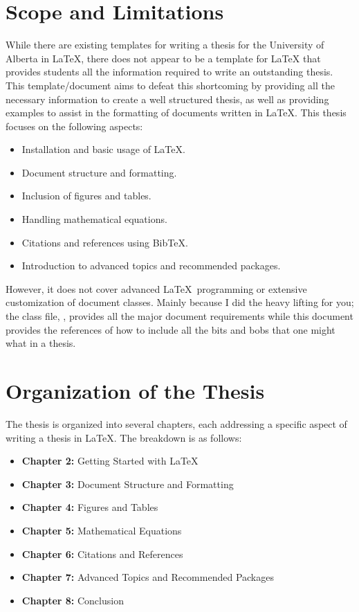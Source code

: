 	\section{Scope and Limitations}
		While there are existing templates for writing a thesis for the University of Alberta in \LaTeX, there does not appear to be a template for \LaTeX{} that provides students all the information required to write an outstanding thesis.
		This template/document aims to defeat this shortcoming by providing all the necessary information to create a well structured thesis, as well as providing examples to assist in the formatting of documents written in \LaTeX{}.
		This thesis focuses on the following aspects:
		\begin{itemize}
			\item Installation and basic usage of \LaTeX.
			\item Document structure and formatting.
			\item Inclusion of figures and tables.
			\item Handling mathematical equations.
			\item Citations and references using BibTeX.
			\item Introduction to advanced topics and recommended packages.
		\end{itemize}

		However, it does not cover advanced \LaTeX\ programming or extensive customization of document classes.
		Mainly because I did the heavy lifting for you; the class file, , provides all the major document requirements while this document provides the references of how to include all the bits and bobs that one might what in a thesis.

	\section{Organization of the Thesis}
		The thesis is organized into several chapters, each addressing a specific aspect of writing a thesis in \LaTeX. 
		The breakdown is as follows:
		\begin{itemize}
			\item \textbf{Chapter 2:} Getting Started with \LaTeX
			\item \textbf{Chapter 3:} Document Structure and Formatting
			\item \textbf{Chapter 4:} Figures and Tables
			\item \textbf{Chapter 5:} Mathematical Equations
			\item \textbf{Chapter 6:} Citations and References
			\item \textbf{Chapter 7:} Advanced Topics and Recommended Packages
			\item \textbf{Chapter 8:} Conclusion
		\end{itemize}

